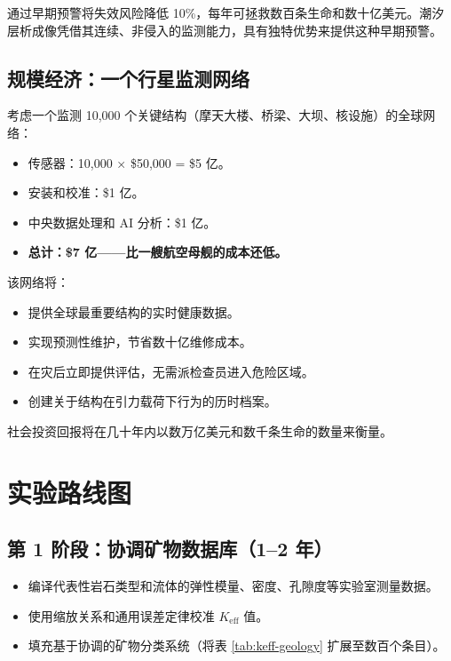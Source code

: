 \documentclass[12pt,a4paper]{article}
\theoremstyle{remark}
\newcommand{\Keff}{K_{\mathrm{eff}}}
\begin{document}
	通过早期预警将失效风险降低 10\%，每年可拯救数百条生命和数十亿美元。潮汐层析成像凭借其连续、非侵入的监测能力，具有独特优势来提供这种早期预警。
	
	\subsection{规模经济：一个行星监测网络}
	
	考虑一个监测 10,000 个关键结构（摩天大楼、桥梁、大坝、核设施）的全球网络：
	
	\begin{itemize}
		\item 传感器：10,000 × \$50,000 = \$5 亿。
		\item 安装和校准：\$1 亿。
		\item 中央数据处理和 AI 分析：\$1 亿。
		\item \textbf{总计：\$7 亿——比一艘航空母舰的成本还低。}
	\end{itemize}
	
	该网络将：
	\begin{itemize}
		\item 提供全球最重要结构的实时健康数据。
		\item 实现预测性维护，节省数十亿维修成本。
		\item 在灾后立即提供评估，无需派检查员进入危险区域。
		\item 创建关于结构在引力载荷下行为的历时档案。
	\end{itemize}
	
	社会投资回报将在几十年内以数万亿美元和数千条生命的数量来衡量。
	
	\section{实验路线图}
	\label{sec:roadmap}
	
	\subsection{第 1 阶段：协调矿物数据库（1–2 年）}
	
	\begin{itemize}
		\item 编译代表性岩石类型和流体的弹性模量、密度、孔隙度等实验室测量数据。
		\item 使用缩放关系和通用误差定律校准 $\Keff$ 值。
		\item 填充基于协调的矿物分类系统（将表 \ref{tab:keff-geology} 扩展至数百个条目）。
	\end{itemize}
	
\end{document}
